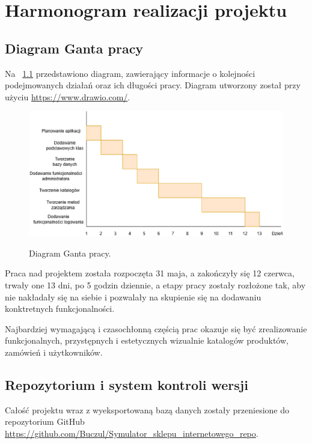 \chapter{Harmonogram realizacji projektu}
\label{cha:harmonogram}

\section{Diagram Ganta pracy}

Na \figurename~\ref{fig6} przedstawiono diagram, zawierający informacje o kolejności podejmowanych działań oraz ich długości pracy.
Diagram utworzony został przy użyciu \url{https://www.drawio.com/}.
\begin{figure}[H]
    \centering
    \includegraphics[width=\linewidth]{figures/fig_0006.eps}\\
    \caption{Diagram Ganta pracy.\label{fig6}}
\end{figure}

Praca nad projektem została rozpoczęta 31 maja, a zakończyły się 12 czerwca, trwały one 13 dni, po 5 godzin dziennie, a etapy pracy zostały rozłożone tak, aby nie nakładały się na siebie i pozwalały na skupienie się na dodawaniu konktretnych funkcjonalności.

Najbardziej wymagającą i czasochłonną częścią prac okazuje się być zrealizowanie funkcjonalnych, przystępnych i estetycznych wizualnie 
katalogów produktów, zamówień i użytkowników.

\section{Repozytorium i system kontroli wersji}
Całość projektu wraz z wyeksportowaną bazą danych zostały przeniesione do repozytorium GitHub \url{https://github.com/Buczul/Symulator_sklepu_internetowego_repo}.